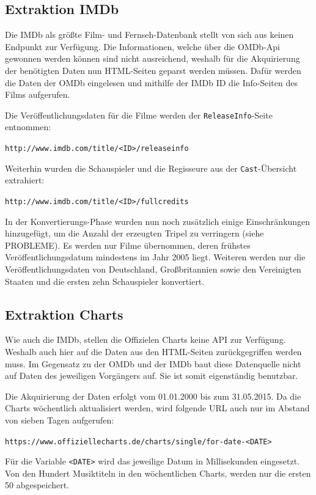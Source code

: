 \documentclass[parskip]{scrartcl}
\begin{document}
\subsection{Extraktion IMDb}

Die IMDb als größte Film- und Fernseh-Datenbank stellt von sich aus keinen Endpunkt zur Verfügung. Die Informationen, welche über die OMDb-Api gewonnen werden können sind nicht ausreichend, weshalb für die Akquirierung der benötigten Daten nun HTML-Seiten geparst werden müssen. Dafür werden die Daten der OMDb eingelesen und mithilfe der IMDb ID die Info-Seiten des Films aufgerufen.

Die Veröffentlichungsdaten für die Filme werden der \texttt{ReleaseInfo}-Seite entnommen:

\texttt{http://www.imdb.com/title/<ID>/releaseinfo}

Weiterhin wurden die Schauspieler und die Regisseure aus der \texttt{Cast}-Übersicht extrahiert:

\texttt{http://www.imdb.com/title/<ID>/fullcredits}

In der Konvertierungs-Phase wurden nun noch zusätzlich einige Einschränkungen hinzugefügt, um die Anzahl der erzeugten Tripel zu verringern (siehe PROBLEME). Es werden nur Filme übernommen, deren frühstes Veröffentlichungsdatum mindestens im Jahr 2005 liegt. Weiteren werden nur die Veröffentlichungsdaten von Deutschland, Großbritannien sowie den Vereinigten Staaten und die ersten zehn Schauspieler konvertiert.

\subsection{Extraktion Charts}

Wie auch die IMDb, stellen die Offizielen Charts keine API zur Verfügung. Weshalb auch hier auf die Daten aus den HTML-Seiten zurückgegriffen werden muss. Im Gegensatz zu der OMDb und der IMDb baut diese Datenquelle nicht auf Daten des jeweiligen Vorgängers auf. Sie ist somit eigenständig benutzbar.

Die Akquirierung der Daten erfolgt vom 01.01.2000 bis zum 31.05.2015. Da die Charts wöchentlich aktualisiert werden, wird folgende URL auch nur im Abstand von sieben Tagen aufgerufen:

\texttt{https://www.offiziellecharts.de/charts/single/for-date-<DATE>}

Für die Variable \texttt{<DATE>} wird das jeweilige Datum in Millisekunden eingesetzt. Von den Hundert Musiktiteln in den wöchentlichen Charts, werden nur die ersten 50 abgespeichert.
\end{document}
